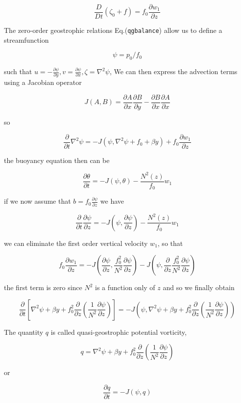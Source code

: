 {\[\frac{D }{Dt}(\zeta_0 +f)= f_0 \frac{\partial  w_1}{\partial z}\]}

The zero-order geostrophic relations Eq.(\texttt{qgbalance}) allow us to
define a streamfunction

\[\psi=p_0/f_0\]

such that
\(u=-\frac{\partial \psi}{\partial y}, v=\frac{\partial \psi}{\partial x}, \zeta = \nabla^2\psi\),
We can then express the advection terms using a Jacobian operator

\[J(A,B) = \frac{\partial A}{\partial x}\frac{\partial B}{\partial y} -\frac{\partial B}{\partial x}\frac{\partial A}{\partial x}\]

so

{\[\frac{\partial }{\partial t}\nabla^2\psi = - J(\psi,\nabla^2\psi + f_0 + \beta y) + f_0\frac{\partial w_1}{\partial z}\]}

the buoyancy equation then can be

\[\frac{\partial \theta}{\partial t} = -J(\psi, \theta) - \frac{N^2(z)}{f_0} w_1\]

if we now assume that \(b = f_0 \frac{\partial \psi}{\partial z}\) we
have

\[\frac{\partial }{\partial t}\frac{\partial \psi}{\partial z} = -J(\psi, \frac{\partial \psi}{\partial z}) - \frac{N^2(z)}{f_0} w_1\]

we can eliminate the first order vertical velocity \(w_1\), so that

\[f_0\frac{\partial w_1}{\partial z} = -J( \frac{\partial \psi}{\partial z}, \frac{f_0^2}{N^2}\frac{\partial \psi}{\partial z}) -J(\psi, \frac{\partial }{\partial z}\frac{f_0^2}{N^2}\frac{\partial \psi}{\partial z})\]

the first term is zero since \(N^2\) is a function only of \(z\) and so
we finally obtain

{\[\frac{\partial }{\partial t}\left[\nabla^2\psi +\beta y+f_0^2\frac{\partial }{\partial z}(\frac{1}{N^2}\frac{\partial \psi}{\partial z})\right]=-J\left(\psi, \nabla^2\psi +\beta y+f_0^2\frac{\partial }{\partial z}(\frac{1}{N^2}\frac{\partial \psi}{\partial z})\right)\]}

The quantity \(q\) is called quasi-geostrophic potential vorticity,

{\[q =\nabla^2\psi +\beta y+f_0^2\frac{\partial }{\partial z}(\frac{1}{N^2}\frac{\partial \psi}{\partial z})\]}

or

\[\frac{\partial q}{\partial t} = -J(\psi,q)\]

